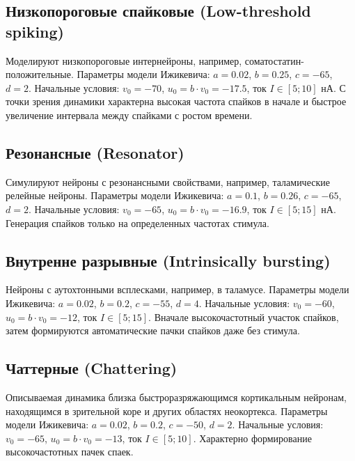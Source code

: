 \subsection{Низкопороговые спайковые (Low-threshold spiking)}

Моделируют низкопороговые интернейроны, например, соматостатин-положительные. Параметры модели Ижикевича: $a=0.02$, $b=0.25$, $c = -65$, $d = 2$. Начальные условия: $v_0 = -70$, $u_0 = b \cdot v_0 = -17.5$, ток $I \in [5; 10]$ нА. С точки зрения динамики характерна высокая частота спайков в начале и быстрое увеличение интервала между спайками с ростом времени.


\subsection{Резонансные (Resonator)}

Симулируют нейроны с резонансными свойствами, например, таламические релейные нейроны. Параметры модели Ижикевича: $a=0.1$, $b=0.26$, $c = -65$, $d = 2$. Начальные условия: $v_0 = -65$, $u_0 = b \cdot v_0 = -16.9$, ток $I \in [5; 15]$ нА. Генерация спайков только на определенных частотах стимула.


\subsection{Внутренне разрывные (Intrinsically bursting)}
Нейроны с аутохтонными всплесками, например, в таламусе. Параметры модели Ижикевича: $a=0.02$, $b=0.2$, $c = -55$, $d = 4$. Начальные условия: $v_0 = -60$, $u_0 = b \cdot v_0 = -12$, ток $I \in [5; 15]$. Вначале высокочастотный участок спайков, затем формируются автоматические пачки спайков даже без стимула.


\subsection{Чаттерные (Chattering)}
Описываемая динамика близка быстроразряжающимся кортикальным нейронам, находящимся в зрительной коре и других областях неокортекса. Параметры модели Ижикевича: $a=0.02$, $b=0.2$, $c = -50$, $d = 2$. Начальные условия: $v_0 = -65$, $u_0 = b \cdot v_0 = -13$, ток $I \in [5; 10]$. Характерно формирование высокочастотных пачек спаек.





\endinput